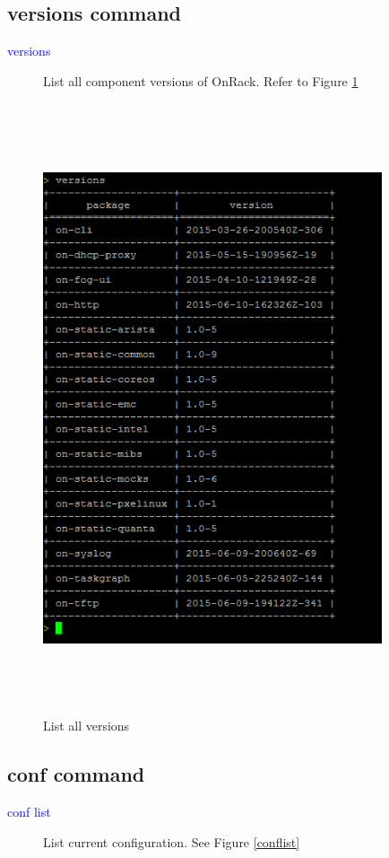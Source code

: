 \documentclass [12pt, a4paper, titlepage]{article}
\begin{document}
\subsection{versions command}
        \begin{description}
            \item[\textcolor{blue}{versions}] List all component versions of OnRack. Refer to Figure \ref{versions}
        \end{description}
        \begin{figure}[H]
        \begin{center}
        \includegraphics[width=10cm,height=18cm]{png/versions.png}
        \end{center}
        \caption{List all versions}
        \label{versions}
        \end{figure}


\subsection{conf command}
        \begin{description}
            \item[\textcolor{blue}{conf list}] List current configuration. See Figure \ref{conflist}
        \end{description}
\end{document}
